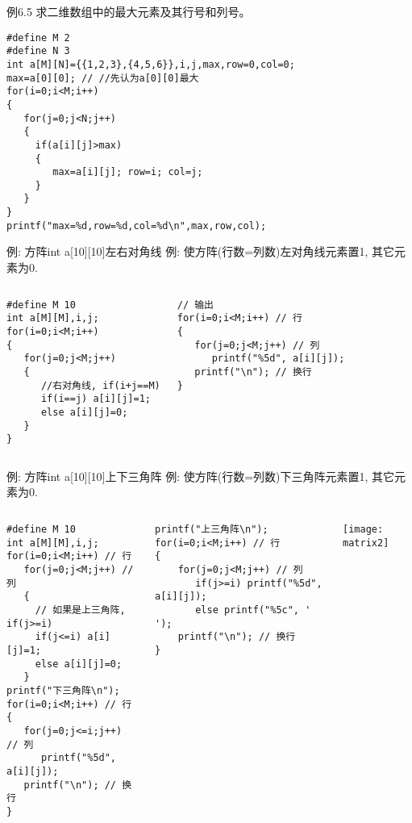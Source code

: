 \begin{frame}{例6.5 求二维数组中的最大元素及其行号和列号。}
\begin{lstlisting}
#define M 2 
#define N 3 
int a[M][N]={{1,2,3},{4,5,6}},i,j,max,row=0,col=0;
max=a[0][0]; // //先认为a[0][0]最大
for(i=0;i<M;i++) 
{
   for(j=0;j<N;j++) 
   {
     if(a[i][j]>max)
     { 
        max=a[i][j]; row=i; col=j;
     } 
   }
}
printf("max=%d,row=%d,col=%d\n",max,row,col);
\end{lstlisting}
\end{frame}

\begin{frame}{例: 方阵int a[10][10]左右对角线}
例: 使方阵(行数=列数)左对角线元素置1, 其它元素为0.
\begin{columns}[T]
\begin{lstlisting}
#define M 10 
int a[M][M],i,j;
for(i=0;i<M;i++) 
{
   for(j=0;j<M;j++) 
   {
      //右对角线, if(i+j==M)
      if(i==j) a[i][j]=1; 
      else a[i][j]=0;
   }
}
\end{lstlisting}
\begin{lstlisting}[frame=leftline]
// 输出
for(i=0;i<M;i++) // 行
{
   for(j=0;j<M;j++) // 列
      printf("%5d", a[i][j]); 
   printf("\n"); // 换行
}
\end{lstlisting}
\end{columns}
\end{frame}

\begin{frame}{例: 方阵int a[10][10]上下三角阵}
\small
例: 使方阵(行数=列数)下三角阵元素置1, 其它元素为0.
\vspace{-0.4cm}
\begin{columns}[T]
\begin{lstlisting}
#define M 10 
int a[M][M],i,j;
for(i=0;i<M;i++) // 行
   for(j=0;j<M;j++) // 列
   {
     // 如果是上三角阵, if(j>=i)
     if(j<=i) a[i][j]=1; 
     else a[i][j]=0;
   }
printf("下三角阵\n"); 
for(i=0;i<M;i++) // 行
{
   for(j=0;j<=i;j++) // 列
      printf("%5d", a[i][j]); 
   printf("\n"); // 换行
}
\end{lstlisting}
\begin{lstlisting}[frame=leftline]
printf("上三角阵\n"); 
for(i=0;i<M;i++) // 行
{
    for(j=0;j<M;j++) // 列
       if(j>=i) printf("%5d", a[i][j]);
       else printf("%5c", ' '); 
    printf("\n"); // 换行
}
\end{lstlisting}
\texttt{[image: matrix2]}
\end{columns}
\vspace{0.001cm}
\end{frame}

